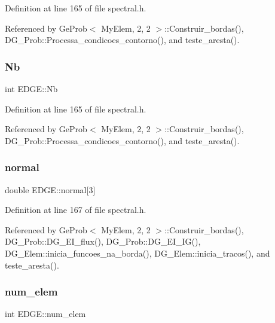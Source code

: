 Definition at line 165 of file spectral.\+h.



Referenced by Ge\+Prob$<$ My\+Elem, 2, 2 $>$\+::\+Construir\+\_\+bordas(), D\+G\+\_\+\+Prob\+::\+Processa\+\_\+condicoes\+\_\+contorno(), and teste\+\_\+aresta().

\mbox{\label{structEDGE_ad0f1a447a4d1b262b2fa1eff986c3091}} 
\subsubsection{\texorpdfstring{Nb}{Nb}}
{\footnotesize\ttfamily int E\+D\+G\+E\+::\+Nb}



Definition at line 165 of file spectral.\+h.



Referenced by Ge\+Prob$<$ My\+Elem, 2, 2 $>$\+::\+Construir\+\_\+bordas(), D\+G\+\_\+\+Prob\+::\+Processa\+\_\+condicoes\+\_\+contorno(), and teste\+\_\+aresta().

\mbox{\label{structEDGE_a9f301d18d111fbc49b8eb67ead2cece8}} 
\subsubsection{\texorpdfstring{normal}{normal}}
{\footnotesize\ttfamily double E\+D\+G\+E\+::normal\mbox{[}3\mbox{]}}



Definition at line 167 of file spectral.\+h.



Referenced by Ge\+Prob$<$ My\+Elem, 2, 2 $>$\+::\+Construir\+\_\+bordas(), D\+G\+\_\+\+Prob\+::\+D\+G\+\_\+\+E\+I\+\_\+flux(), D\+G\+\_\+\+Prob\+::\+D\+G\+\_\+\+E\+I\+\_\+\+I\+G(), D\+G\+\_\+\+Elem\+::inicia\+\_\+funcoes\+\_\+na\+\_\+borda(), D\+G\+\_\+\+Elem\+::inicia\+\_\+tracos(), and teste\+\_\+aresta().

\mbox{\label{structEDGE_ac581aec971087849378dfbaadcf348d0}} 
\subsubsection{\texorpdfstring{num\+\_\+elem}{num\_elem}}
{\footnotesize\ttfamily int E\+D\+G\+E\+::num\+\_\+elem}



